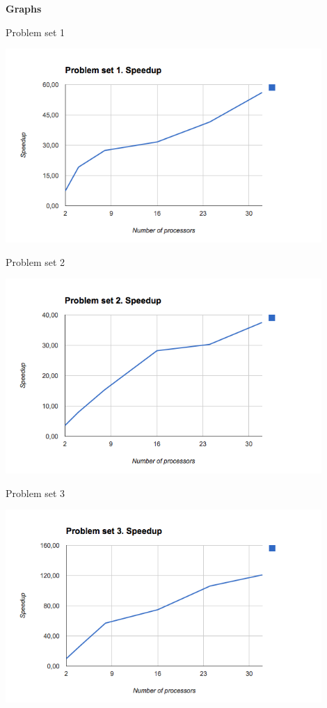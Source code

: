 \documentclass[12pt]{article}
\begin{document}
\textbf{Graphs}
\begin{center}

Problem set 1

\includegraphics[width=0.9\textwidth]{graphs/ps1.png}

Problem set 2

\includegraphics[width=0.9\textwidth]{graphs/ps2.png}

\clearpage

Problem set 3

\includegraphics[width=0.9\textwidth]{graphs/ps3.png}

\end{center}
\end{document}
